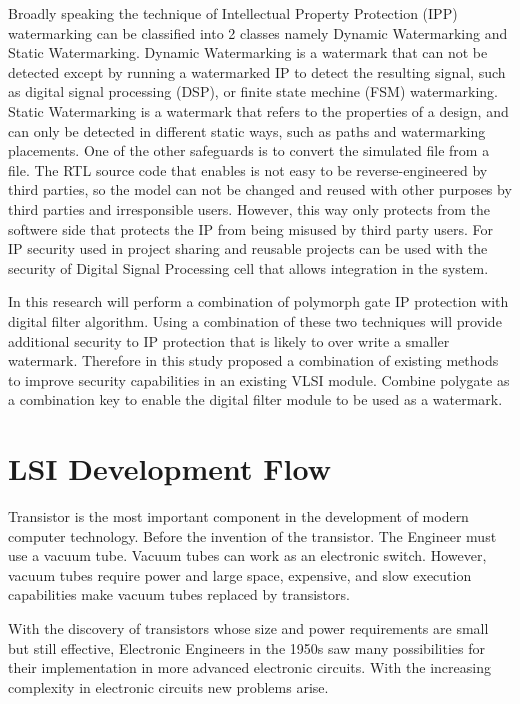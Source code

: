 \documentclass[10pt,journal,compsoc,letterpaper,final]{IEEEtran}
\begin{document}
Broadly speaking the technique of Intellectual Property Protection (IPP) watermarking can be classified into 2 classes namely Dynamic Watermarking and Static Watermarking. Dynamic Watermarking is a watermark that can not be detected except by running a watermarked IP to detect the resulting signal, such as digital signal processing (DSP), or finite state mechine (FSM) watermarking. Static Watermarking is a watermark that refers to the properties of a design, and can only be detected in different static ways, such as paths and watermarking placements.\cite{chapman} One of the other safeguards is to convert the simulated file from a file. The RTL source code that enables is not easy to be reverse-engineered by third parties, so the model can not be changed and reused with other purposes by third parties and irresponsible users. However, this way only protects from the softwere side that protects the IP from being misused by third party users.\cite{water} For IP security used in project sharing and reusable projects can be used with the security of Digital Signal Processing cell that allows integration in the system.

In this research will perform a combination of polymorph gate IP protection with digital filter algorithm. Using a combination of these two techniques will provide additional security to IP protection that is likely to over write a smaller watermark. Therefore in this study proposed a combination of existing methods to improve security capabilities in an existing VLSI module. Combine polygate as a combination key to enable the digital filter module to be used as a watermark.

\section{LSI Development Flow}
Transistor is the most important component in the development of modern computer technology. Before the invention of the transistor. The Engineer must use a vacuum tube. Vacuum tubes can work as an electronic switch. However, vacuum tubes require power and large space, expensive, and slow execution capabilities make vacuum tubes replaced by transistors.

With the discovery of transistors whose size and power requirements are small but still effective, Electronic Engineers in the 1950s saw many possibilities for their implementation in more advanced electronic circuits. With the increasing complexity in electronic circuits new problems arise.
\end{document}
